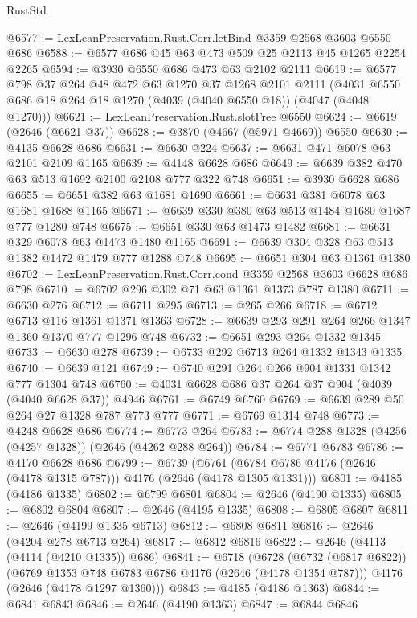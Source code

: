 \begin{lexlean}{RustStd}
\begin{coremodule}
@6577 := LexLeanPreservation.Rust.Corr.letBind @3359 @2568 @3603 @6550 @686
@6588 := @6577 @686 @45 @63 @473 @509 @25 @2113 @45 @1265 @2254 @2265
@6594 := @3930 @6550 @686 @473 @63 @2102 @2111
@6619 := @6577
    @798
    @37
    @264
    @48
    @472
    @63
    @1270
    @37
    @1268
    @2101
    @2111
    (@4031 @6550 @686 @18 @264 @18 @1270 (@4039 (@4040 @6550 @18)) (@4047 (@4048 @1270)))
@6621 := LexLeanPreservation.Rust.slotFree @6550
@6624 := @6619 (@2646 (@6621 @37))
@6628 := @3870 (@4667 (@5971 @4669)) @6550
@6630 := @4135 @6628 @686
@6631 := @6630 @224
@6637 := @6631 @471 @6078 @63 @2101 @2109 @1165
@6639 := @4148 @6628 @686
@6649 := @6639 @382 @470 @63 @513 @1692 @2100 @2108 @777 @322 @748
@6651 := @3930 @6628 @686
@6655 := @6651 @382 @63 @1681 @1690
@6661 := @6631 @381 @6078 @63 @1681 @1688 @1165
@6671 := @6639 @330 @380 @63 @513 @1484 @1680 @1687 @777 @1280 @748
@6675 := @6651 @330 @63 @1473 @1482
@6681 := @6631 @329 @6078 @63 @1473 @1480 @1165
@6691 := @6639 @304 @328 @63 @513 @1382 @1472 @1479 @777 @1288 @748
@6695 := @6651 @304 @63 @1361 @1380
@6702 := LexLeanPreservation.Rust.Corr.cond @3359 @2568 @3603 @6628 @686 @798
@6710 := @6702 @296 @302 @71 @63 @1361 @1373 @787 @1380
@6711 := @6630 @276
@6712 := @6711 @295
@6713 := @265 @266
@6718 := @6712 @6713 @116 @1361 @1371 @1363
@6728 := @6639 @293 @291 @264 @266 @1347 @1360 @1370 @777 @1296 @748
@6732 := @6651 @293 @264 @1332 @1345
@6733 := @6630 @278
@6739 := @6733 @292 @6713 @264 @1332 @1343 @1335
@6740 := @6639 @121
@6749 := @6740 @291 @264 @266 @904 @1331 @1342 @777 @1304 @748
@6760 := @4031 @6628 @686 @37 @264 @37 @904 (@4039 (@4040 @6628 @37)) @4946
@6761 := @6749 @6760
@6769 := @6639 @289 @50 @264 @27 @1328 @787 @773 @777
@6771 := @6769 @1314 @748
@6773 := @4248 @6628 @686
@6774 := @6773 @264
@6783 := @6774 @288 @1328 (@4256 (@4257 @1328)) (@2646 (@4262 @288 @264))
@6784 := @6771 @6783
@6786 := @4170 @6628 @686
@6799 := @6739
    (@6761 (@6784 @6786 @4176 (@2646 (@4178 @1315 @787))) @4176 (@2646 (@4178 @1305 @1331)))
@6801 := @4185 (@4186 @1335)
@6802 := @6799 @6801
@6804 := @2646 (@4190 @1335)
@6805 := @6802 @6804
@6807 := @2646 (@4195 @1335)
@6808 := @6805 @6807
@6811 := @2646 (@4199 @1335 @6713)
@6812 := @6808 @6811
@6816 := @2646 (@4204 @278 @6713 @264)
@6817 := @6812 @6816
@6822 := @2646 (@4113 (@4114 (@4210 @1335)) @686)
@6841 := @6718
    (@6728
      (@6732 (@6817 @6822))
      (@6769 @1353 @748 @6783 @6786 @4176 (@2646 (@4178 @1354 @787)))
      @4176
      (@2646 (@4178 @1297 @1360)))
@6843 := @4185 (@4186 @1363)
@6844 := @6841 @6843
@6846 := @2646 (@4190 @1363)
@6847 := @6844 @6846

\end{coremodule}
\end{lexlean}
